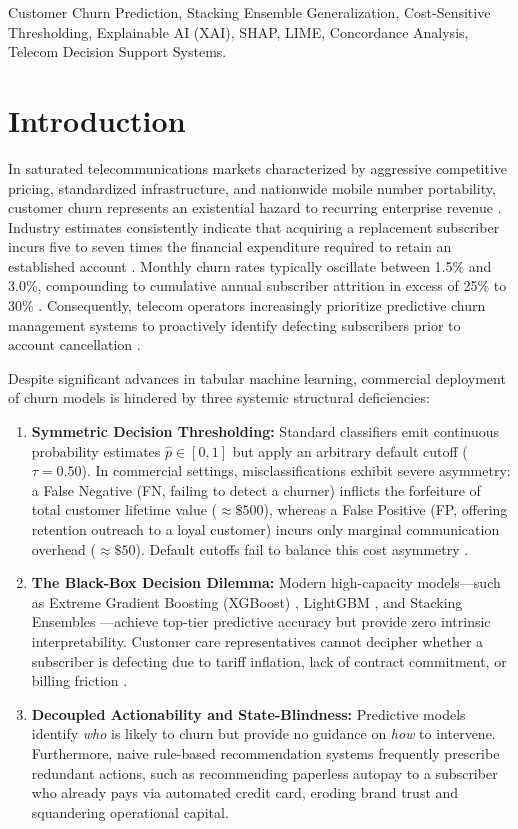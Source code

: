 \documentclass[conference]{IEEEtran}
\begin{document}
\begin{IEEEkeywords}
Customer Churn Prediction, Stacking Ensemble Generalization, Cost-Sensitive Thresholding, Explainable AI (XAI), SHAP, LIME, Concordance Analysis, Telecom Decision Support Systems.
\end{IEEEkeywords}

\section{Introduction}
In saturated telecommunications markets characterized by aggressive competitive pricing, standardized infrastructure, and nationwide mobile number portability, customer churn represents an existential hazard to recurring enterprise revenue \cite{verbeke2012new}. Industry estimates consistently indicate that acquiring a replacement subscriber incurs five to seven times the financial expenditure required to retain an established account \cite{amin2019customer}. Monthly churn rates typically oscillate between 1.5\% and 3.0\%, compounding to cumulative annual subscriber attrition in excess of 25\% to 30\% \cite{ullo2021comprehensive}. Consequently, telecom operators increasingly prioritize predictive churn management systems to proactively identify defecting subscribers prior to account cancellation \cite{coussement2017benchmarking}.

Despite significant advances in tabular machine learning, commercial deployment of churn models is hindered by three systemic structural deficiencies:
\begin{enumerate}
    \item \textbf{Symmetric Decision Thresholding:} Standard classifiers emit continuous probability estimates $\hat{p} \in [0, 1]$ but apply an arbitrary default cutoff ($\tau = 0.50$). In commercial settings, misclassifications exhibit severe asymmetry: a False Negative (FN, failing to detect a churner) inflicts the forfeiture of total customer lifetime value ($\approx \$500$), whereas a False Positive (FP, offering retention outreach to a loyal customer) incurs only marginal communication overhead ($\approx \$50$). Default cutoffs fail to balance this cost asymmetry \cite{elkan2001foundations}.
    \item \textbf{The Black-Box Decision Dilemma:} Modern high-capacity models—such as Extreme Gradient Boosting (XGBoost) \cite{chen2016xgboost}, LightGBM \cite{ke2017lightgbm}, and Stacking Ensembles \cite{wolpert1992stacked}—achieve top-tier predictive accuracy but provide zero intrinsic interpretability. Customer care representatives cannot decipher whether a subscriber is defecting due to tariff inflation, lack of contract commitment, or billing friction \cite{albuquerque2022machine}.
    \item \textbf{Decoupled Actionability and State-Blindness:} Predictive models identify \textit{who} is likely to churn but provide no guidance on \textit{how} to intervene. Furthermore, naive rule-based recommendation systems frequently prescribe redundant actions, such as recommending paperless autopay to a subscriber who already pays via automated credit card, eroding brand trust and squandering operational capital.
\end{enumerate}
\end{document}
